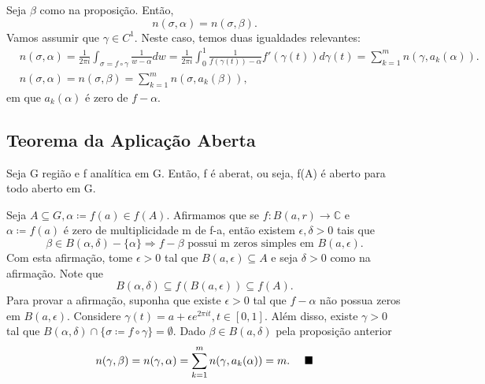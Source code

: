 \documentclass[complex.tex]{subfiles}
\begin{document}
\begin{proof*}
	Seja $\beta$ como na proposição. Então,
	$$
		n(\sigma, \alpha) = n(\sigma, \beta).
	$$
	Vamos assumir que $\gamma\in{C^{1}}$. Neste caso, temos duas igualdades relevantes:
	\begin{align*}
		 & n(\sigma, \alpha) = \frac{1}{2\pi i}\int_{\sigma=f\circ{\gamma}}^{}\frac{1}{w-\alpha}dw = \frac{1}{2\pi i}\int_{0}^{1}\frac{1}{f(\gamma(t))-\alpha}f'(\gamma(t))d\gamma(t) = \sum\limits_{k=1}^{m}n(\gamma, a_{k}(\alpha)). \\
		 & n(\sigma, \alpha) = n(\sigma, \beta) = \sum\limits_{k=1}^{m}n(\sigma, a_{k}(\beta)),
	\end{align*}
	em que $a_{k}(\alpha)$ é zero de $f-\alpha.$ \qedsymbol
\end{proof*}
\subsection{Teorema da Aplicação Aberta}
\begin{theorem*}
	Seja G região e f analítica em G. Então, f é aberat, ou seja, f(A) é aberto para todo aberto em G.
\end{theorem*}
\begin{proof*}
	Seja $A\subseteq{G}, \alpha\coloneqq f(a)\in{f(A)}.$ Afirmamos que se $f:B(a, r)\rightarrow \mathbb{C}$ e $\alpha\coloneqq f(a)$ é zero de
	multiplicidade m de f-a, então existem $\epsilon, \delta > 0$ tais que
	$$
		\beta\in{B(\alpha, \delta)- \{\alpha\} }\Rightarrow f-\beta\text{ possui m zeros simples em }B(a, \epsilon).
	$$
	Com esta afirmação, tome $\epsilon > 0$ tal que $B(a, \epsilon)\subseteq{A}$ e seja $\delta > 0$ como na afirmação.
	Note que
	$$
		B(\alpha, \delta)\subseteq{f(B(a, \epsilon))}\subseteq{f(A)}.
	$$
	Para provar a afirmação, suponha que existe $\epsilon > 0$ tal que $f - \alpha$ não possua zeros em $B(a, \epsilon)$. Considere
	$\gamma(t) = a + \epsilon e^{2\pi it}, t\in[0, 1].$ Além disso, existe $\gamma > 0$ tal que $B(\alpha, \delta)\cap \{\sigma\coloneqq f\circ{\gamma}\}=\emptyset$.
	Dado $\beta\in{B(a, \delta)}$ pela proposição anterior
	$$
		n(\gamma, \beta) = n(\gamma, \alpha) = \sum\limits_{k=1}^{m}n(\gamma, a_{k}(\alpha)) = m.\quad\text{ $\blacksquare$}
	$$
\end{proof*}
\end{document}
